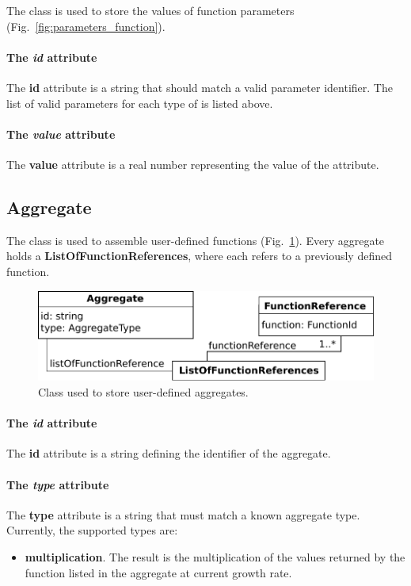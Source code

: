 The \parameter{} class is used to store the values of function parameters
(Fig.~\ref{fig:parameters_function}).

\paragraph{The \textit{id} attribute}
The \textbf{id} attribute is a string that should match a valid parameter
identifier.
The list of valid parameters for each type of \function{} is listed above.

\paragraph{The \textit{value} attribute}
The \textbf{value} attribute is a real number representing
the value of the attribute.


\subsection{Aggregate}
\label{sec:aggregate}

The \aggregate{} class is used to assemble user-defined functions
(Fig.~\ref{fig:parameters_aggregate}).
Every aggregate holds a \textbf{ListOfFunctionReferences},
where each \functionreference{} refers to a previously defined function.

\begin{figure}
  \centering
  \includegraphics[scale=0.8]{figures/parameters_aggregate}
  \caption{Class used to store user-defined aggregates.}
\label{fig:parameters_aggregate}
\end{figure}

\paragraph{The \textit{id} attribute}
The \textbf{id} attribute is a string defining the identifier of the aggregate.

\paragraph{The \textit{type} attribute}
The \textbf{type} attribute is a string that must match a known aggregate type.
Currently, the supported types are:
\begin{itemize}
  \item \textbf{multiplication}.
  The result is the multiplication of the values returned by the function
  listed in the aggregate at current growth rate.
\end{itemize}


